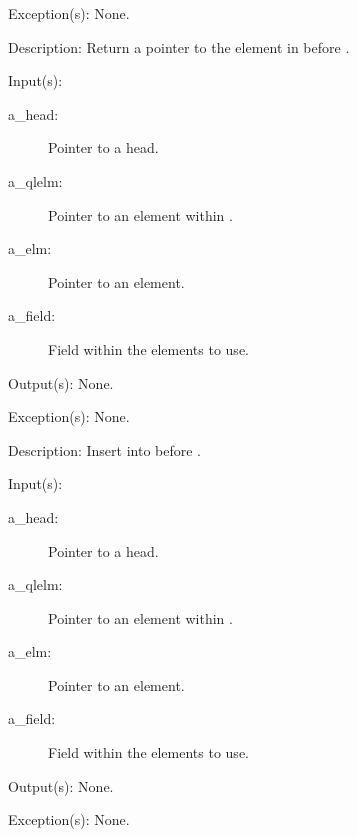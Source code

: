 \begin{capi}
\begin{capilist}
\begin{description}
		\end{description}
	\item[Exception(s): ] None.
	\item[Description: ]
		Return a pointer to the element in  before
		.
	\end{capilist}
\label{ql_before_insert}
	\begin{capilist}
	\item[Input(s): ]
		\begin{description}\item[]
		\item[a\_head: ]
			Pointer to a  head.
		\item[a\_qlelm: ]
			Pointer to an element within .
		\item[a\_elm: ]
			Pointer to an element.
		\item[a\_field: ]
			Field within the  elements to use.
		\end{description}
	\item[Output(s): ] None.
	\item[Exception(s): ] None.
	\item[Description: ]
		Insert  into  before .
	\end{capilist}
\label{ql_after_insert}
	\begin{capilist}
	\item[Input(s): ]
		\begin{description}\item[]
		\item[a\_head: ]
			Pointer to a \classname{ql} head.
		\item[a\_qlelm: ]
			Pointer to an element within \cvar{a\_head}.
		\item[a\_elm: ]
			Pointer to an element.
		\item[a\_field: ]
			Field within the  elements to use.
		\end{description}
	\item[Output(s): ] None.
	\item[Exception(s): ] None.

\end{capilist}
\end{capi}

